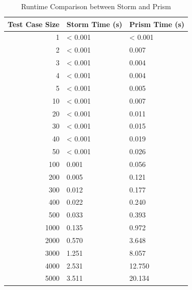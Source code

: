 \begin{table}[t]
\label{tab:runtime_comparison}
\centering
\begin{tabular}{r|l|l}
\toprule
\textbf{Test Case Size} & \textbf{Storm Time (s)} & \textbf{Prism Time (s)} \\
\midrule
1    & < 0.001   & < 0.001 \\
2    & < 0.001 & 0.007   \\
3    & < 0.001 & 0.004   \\
4    & < 0.001 & 0.004   \\
5    & < 0.001 & 0.005   \\
10   & < 0.001 & 0.007   \\
20   & < 0.001 & 0.011   \\
30   & < 0.001 & 0.015   \\
40   & < 0.001 & 0.019   \\
50   & < 0.001 & 0.026   \\
100  & 0.001   & 0.056   \\
200  & 0.005   & 0.121   \\
300  & 0.012   & 0.177   \\
400  & 0.022   & 0.240   \\
500  & 0.033   & 0.393   \\
1000 & 0.135   & 0.972   \\
2000 & 0.570   & 3.648   \\
3000 & 1.251   & 8.057   \\
4000 & 2.531   & 12.750  \\
5000 & 3.511   & 20.134  \\
\bottomrule
\end{tabular}
\caption{Runtime Comparison between Storm and Prism}
\end{table}